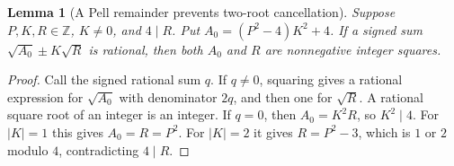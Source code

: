 \documentclass[11pt,letterpaper]{article}
\newtheorem{lemma}[theorem]{Lemma}
\theoremstyle{remark}\newtheorem{remark}[theorem]{Remark}
\newcommand{\Z}{\mathbb Z}\newcommand{\N}{\mathbb N}
\begin{document}
\begin{lemma}[A Pell remainder prevents two-root cancellation]\label{lem:remainder}
Suppose $P,K,R\in\Z$, $K\ne0$, and $4\mid R$. Put
$A_0=(P^2-4)K^2+4$. If a signed sum
$\sqrt{A_0}\mathbin{\pm}K\sqrt R$ is rational, then both $A_0$ and $R$
are nonnegative integer squares.
\end{lemma}
\begin{proof}
Call the signed rational sum $q$. If $q\ne0$, squaring gives a rational
expression for $\sqrt{A_0}$ with denominator $2q$, and then one for
$\sqrt R$. A rational square root of an integer is an integer.
If $q=0$, then $A_0=K^2R$, so $K^2\mid4$. For $|K|=1$ this gives
$A_0=R=P^2$. For $|K|=2$ it gives $R=P^2-3$, which is $1$ or $2$
modulo $4$, contradicting $4\mid R$.
\end{proof}
\end{document}
